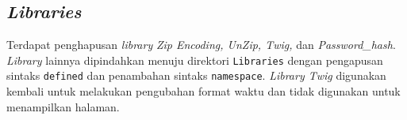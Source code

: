 \subsection{\textit{Libraries}}
Terdapat penghapusan \textit{library} \textit{Zip Encoding, UnZip, Twig,} dan \textit{Password\_hash}. \textit{Library} lainnya dipindahkan menuju direktori \texttt{Libraries} dengan pengapusan sintaks \texttt{defined} dan penambahan sintaks \texttt{namespace}. \textit{Library Twig} digunakan kembali untuk melakukan pengubahan format waktu dan tidak digunakan untuk menampilkan halaman.